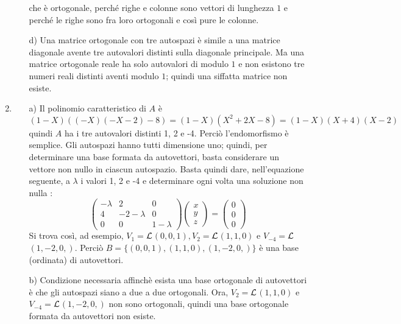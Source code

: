 \begin{enumerate}
\begin{itemize}
che \`{e} ortogonale, perch\'{e} righe e colonne sono vettori di lunghezza $1$ e perch\'{e} le righe sono fra loro ortogonali e cos\`{i} pure le colonne.
\item[d)] Una matrice ortogonale con tre autospazi \`{e} simile a una matrice diagonale avente tre autovalori distinti sulla diagonale principale. Ma una matrice ortogonale reale ha solo autovalori di modulo $1$ e non esistono tre numeri reali distinti aventi modulo $1$; quindi una siffatta matrice non esiste.
\end{itemize}

\item
\begin{itemize}
\item[a)] Il polinomio caratteristico di $A$ \`{e}
$$(1 - X)((-X)(-X - 2) - 8) = (1 - X)(X^{2} + 2X - 8) = (1 - X)(X + 4)(X - 2)$$
quindi $A$ ha i tre autovalori distinti 1, 2 e -4. Perci\`{o} l'endomorfismo \`{e} semplice. \newline
Gli autospazi hanno tutti dimensione uno; quindi, per determinare una base formata da autovettori, basta considerare un vettore non nullo in ciascun autospazio. \newline
Basta quindi dare, nell'equazione seguente, a $\lambda$ i valori 1, 2 e -4 e determinare ogni volta una soluzione non nulla :
$$\left ( \begin{array}{ccc} -\lambda & 2 & 0 \\ 4 & -2-\lambda & 0 \\ 0 & 0 & 1-\lambda \end{array} \right ) \left ( \begin{array}{c} x \\ y \\ z \end{array} \right ) = \left ( \begin{array}{c}  0 \\ 0 \\ 0 \end{array} \right )$$
Si trova cos\`{i}, ad esempio, $V_{1} = $$\cal{L}$$(0,0,1), V_{2} = $$\cal{L}$$(1,1,0)$ e $V_{-4} = $$\cal{L}$$(1,-2,0,)$. \newline
Perci\`{o} $B = \{ (0,0,1),(1,1,0),(1,-2,0,) \}$ \`{e} una base (ordinata) di autovettori.
\item[b)] Condizione necessaria affinch\`{e} esista una base ortogonale di autovettori \`{e} che gli autospazi siano a due a due ortogonali. \newline
Ora, $V_{2} = $$\cal{L}$$(1,1,0)$ e  $V_{-4} = $$\cal{L}$$(1,-2,0,)$ non sono ortogonali, quindi una base ortogonale formata da autovettori non esiste.

\end{itemize}
\end{enumerate}
